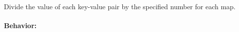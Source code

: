 Divide the value of each key-value pair by the specified number for each map.

\paragraph{Behavior:}
\begin{itemize}[noitemsep]


\end{itemize}

